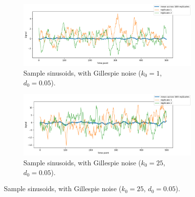 \begin{figure}
  \centering
  \begin{subfigure}[t]{0.45\textwidth}
  \centering
    \includegraphics[width=\linewidth]{gillespie_k1_d0p05_mean.png}
    \caption{
      Sample sinusoids, with Gillespie noise ($k_{0} = 1$, $d_{0} = 0.05$).
    }
    \label{fig:acf-noiseamplitude-lowk0-ts}
  \end{subfigure}%
  \begin{subfigure}[t]{0.45\textwidth}
  \centering
    \includegraphics[width=\linewidth]{gillespie_k25_d0p05_mean.png}
    \caption{
      Sample sinusoids, with Gillespie noise ($k_{0} = 25$, $d_{0} = 0.05$).
    }
    \label{fig:acf-noiseamplitude-highk0-ts}
  \end{subfigure}


\end{figure}
